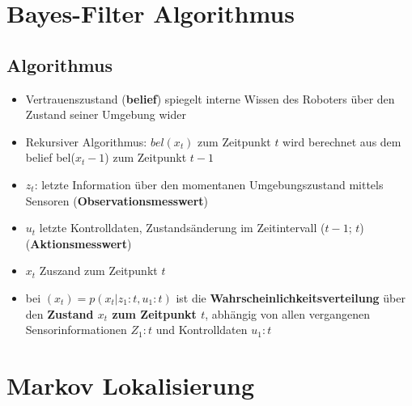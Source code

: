 \section{Bayes-Filter Algorithmus}
\subsection{Algorithmus}
\begin{itemize}
	\item Vertrauenszustand (\textbf{belief}) spiegelt interne Wissen des Roboters über den Zustand seiner Umgebung wider
	\item Rekursiver Algorithmus: $bel(x_t)$ zum Zeitpunkt $t$ wird berechnet aus dem belief bel($x_t-1$) zum Zeitpunkt $t-1$
	\item $z_t$: letzte Information über den momentanen Umgebungszustand mittels Sensoren (\textbf{Observationsmesswert})
	\item $u_t$ letzte Kontrolldaten, Zustandsänderung im Zeitintervall ($t-1$; $t$) (\textbf{Aktionsmesswert})
	\item $x_t$ Zuszand zum Zeitpunkt $t$
	\item bei $(x_t) = p(x_t |z_1:t, u_1:t)$ ist die \textbf{Wahrscheinlichkeitsverteilung} über den \textbf{Zustand $x_t$ zum Zeitpunkt $t$}, abhängig von allen vergangenen Sensorinformationen $Z_1:t$ und Kontrolldaten $u_1:t$ 
\end{itemize}
\section{Markov Lokalisierung}
